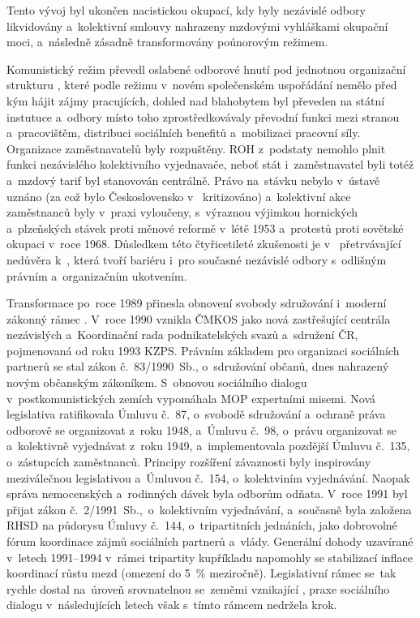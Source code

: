 Tento vývoj byl ukončen nacistickou okupací, kdy byly nezávislé odbory likvidovány a~kolektivní smlouvy nahrazeny mzdovými vyhláškami okupační moci, a~následně zásadně transformovány poúnorovým režimem.\par

Komunistický režim převedl oslabené odborové hnutí pod jednotnou organizační strukturu , které podle režimu v~novém společenském uspořádání nemělo před kým hájit zájmy pracujících, dohled nad blahobytem byl převeden na státní instutuce a~odbory místo toho zprostředkovávaly převodní funkci mezi stranou a~pracovištěm, distribuci sociálních benefitů a~mobilizaci pracovní síly. Organizace zaměstnavatelů byly rozpuštěny.
\Ac{ROH} z~podstaty nemohlo plnit funkci nezávislého kolektivního vyjednavače, neboť stát i~zaměstnavatel byli totéž a~mzdový tarif byl stanovován centrálně. Právo na~stávku nebylo v~ústavě uznáno (za což bylo Československo v~ kritizováno) a~kolektivní akce zaměstnanců byly v~praxi vyloučeny, s~výraznou výjimkou hornických a~plzeňských stávek proti měnové reformě v~létě 1953 a~protestů proti sovětské okupaci v~roce 1968.
Důsledkem této čtyřicetileté zkušenosti je v~ přetrvávající nedůvěra k~, která tvoří bariéru i~pro současné nezávislé odbory s~odlišným právním a~organizačním ukotvením.~\cite{Pokorny_HistorieOdbory2020}~\cite{Pokorny_100letMOP2019}\par

Transformace po~roce 1989 přinesla obnovení svobody sdružování i~moderní zákonný rámec .
V~roce 1990 vznikla \acf{ČMKOS} jako nová zastřešující centrála nezávislých  a~Koordinační rada podnikatelských svazů a~sdružení \acs{ČR}, pojmenovaná od roku 1993 \acf{KZPS}. Právním základem pro organizaci sociálních partnerů se stal zákon č.~83/1990~Sb., o~sdružování občanů, dnes nahrazený novým občanským zákoníkem. S~obnovou sociálního dialogu v~postkomunistických zemích vypomáhala \ac{MOP} expertními misemi. Nová legislativa ratifikovala Úmluvu č.~87, o~svobodě sdružování a~ochraně práva odborově se organizovat z~roku 1948, a~Úmluvu č.~98, o~právu organizovat se a~kolektivně vyjednávat z~roku 1949, a~implementovala pozdější Úmluvu č.~135, o~zástupcích zaměstnanců. Principy rozšíření závaznosti  byly inspirovány meziválečnou legislativou a~Úmluvou č.~154, o~kolektviním vyjednávání. Naopak správa nemocenských a~rodinných dávek byla odborům odňata. V~roce 1991 byl přijat zákon č.~2/1991~Sb.,\ o~kolektivním vyjednávání, a~současně byla založena \ac{RHSD} na půdorysu Úmluvy č.~144, o~tripartitních jednáních, jako dobrovolné fórum koordinace zájmů sociálních partnerů a~vlády. Generální dohody uzavírané v~letech 1991--1994 v~rámci tripartity kupříkladu napomohly se stabilizací inflace koordinací růstu mezd (omezení do \SI{5}{\percent} meziročně).
Legislativní rámec se~tak rychle dostal na~úroveň srovnatelnou se~zeměmi vznikající , praxe sociálního dialogu v~následujících letech však s~tímto rámcem nedržela krok.\par

